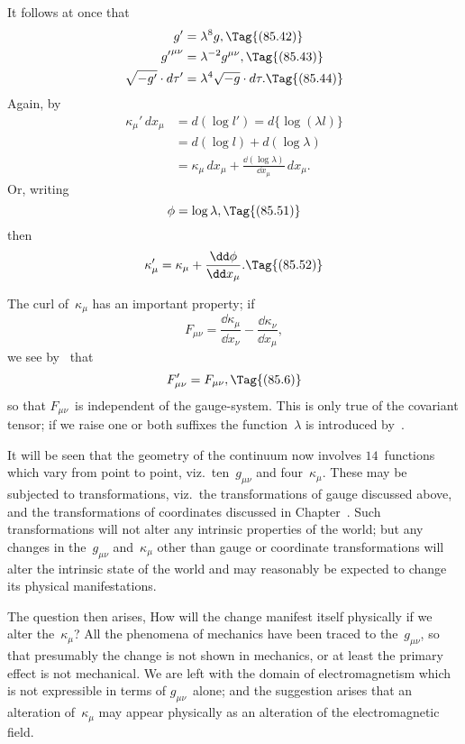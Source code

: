 \documentclass[12pt]{book}
\begin{document}
It follows at once that
%
\begin{align*}
g' & = \lambda^{8} g,
\Tag{(85.42)} \\
{g'}^{\mu\nu} &= \lambda^{-2} g^{\mu\nu},
\Tag{(85.43)} \\
\sqrt{-g'} \cdot d\tau' &= \lambda^{4} \sqrt{-g} \cdot d\tau.
\Tag{(85.44)}
\end{align*}
Again, by~
\begin{align*}
  \kappa_{\mu}'\, dx_{\mu}
  &= d(\log l') = d\{\log(\lambda l)\} \\
  &= d(\log l) + d(\log\lambda) \\
  &= \kappa_{\mu}\, dx_{\mu} + \frac{\dd(\log\lambda)}{\dd x_{\mu}}\, dx_{\mu}.
\end{align*}
Or, writing
\[
\phi = \log\lambda,
\Tag{(85.51)}
\]
then
\[
\kappa_{\mu}' = \kappa_{\mu} + \frac{\dd\phi}{\dd x_{\mu}}.
\Tag{(85.52)}
\]

The curl of~$\kappa_{\mu}$ has an important property; if
\[
F_{\mu\nu} = \frac{\dd\kappa_{\mu}}{\dd x_{\nu}} - \frac{\dd\kappa_{\nu}}{\dd x_{\mu}},
\]
we see by~ that
\[
F_{\mu\nu}' = F_{\mu\nu},
\Tag{(85.6)}
\]
so that $F_{\mu\nu}$~is independent of the gauge\hyp{}system. This is only true of the covariant
tensor; if we raise one or both suffixes the function~$\lambda$ is introduced
by~.

It will be seen that the geometry of the continuum now involves $14$~functions
which vary from point to point, viz.\ ten~$g_{\mu\nu}$ and four~$\kappa_{\mu}$. These may be subjected
to transformations, viz.\ the transformations of gauge discussed above,
and the transformations of coordinates discussed in Chapter~\@. Such transformations
will not alter any intrinsic properties of the world; but any changes
in the~$g_{\mu\nu}$ and~$\kappa_{\mu}$ other than gauge or coordinate transformations will alter the
intrinsic state of the world and may reasonably be expected to change its
physical manifestations.

The question then arises, How will the change manifest itself physically if
we alter the~$\kappa_{\mu}$? All the phenomena of mechanics have been traced to the~$g_{\mu\nu}$,
so that presumably the change is not shown in mechanics, or at least the
primary effect is not mechanical. We are left with the domain of electromagnetism
which is not expressible in terms of $g_{\mu\nu}$~alone; and the suggestion
arises that an alteration of~$\kappa_{\mu}$ may appear physically as an alteration of the
electromagnetic field.
\end{document}
